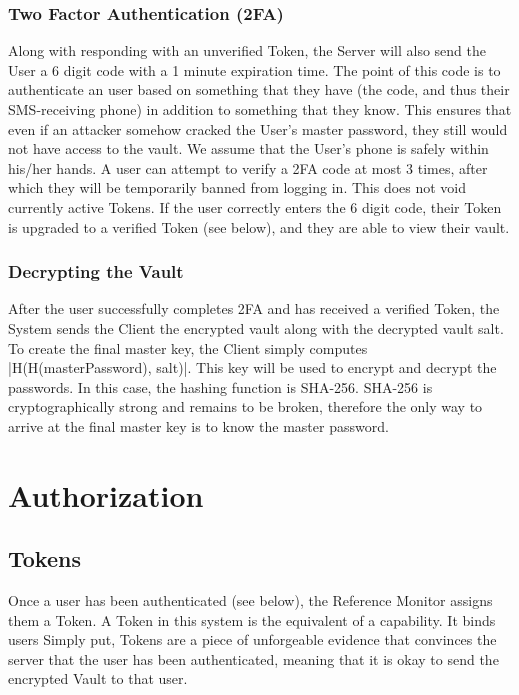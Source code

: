 \documentclass{article}
\begin{document}
\subsubsection{Two Factor Authentication (2FA)}
\par Along with responding with an unverified Token, the Server will also send the User a 6 digit code with a 1 minute expiration time. The point of this code is to authenticate an user based on something that they have (the code, and thus their SMS-receiving phone) in addition to something that they know. This ensures that even if an attacker somehow cracked the User's master password, they still would not have access to the vault. We assume that the User's phone is safely within his/her hands. A user can attempt to verify a 2FA code at most 3 times, after which they will be temporarily banned from logging in. This does not void currently active Tokens. If the user correctly enters the 6 digit code, their Token is upgraded to a verified Token (see below), and they are able to view their vault.

\subsubsection{Decrypting the Vault}
After the user successfully completes 2FA and has received a verified Token, the System sends the Client the encrypted vault along with the decrypted vault salt. To create the final master key, the Client simply computes |H(H(masterPassword), salt)|. This key will be used to encrypt and decrypt the passwords. In this case, the hashing function is SHA-256. SHA-256 is cryptographically strong and remains to be broken, therefore the only way to arrive at the final master key is to know the master password.

\section{Authorization}

\subsection{Tokens}
\label{sub:tokens}
\par Once a user has been authenticated (see below), the Reference Monitor assigns them a Token. A Token in this system is the equivalent of a capability. It binds users  Simply put, Tokens are a piece of unforgeable evidence that convinces the server that the user has been authenticated, meaning that it is okay to send the encrypted Vault to that user.
\end{document}
